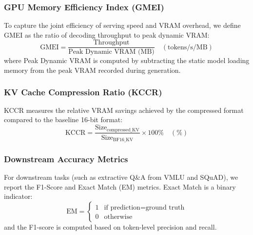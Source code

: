 \subsubsection{GPU Memory Efficiency Index (GMEI)}
To capture the joint efficiency of serving speed and VRAM overhead, we define GMEI as the ratio of decoding throughput to peak dynamic VRAM:
\begin{equation}
\text{GMEI} = \frac{\text{Throughput}}{\text{Peak Dynamic VRAM (MB)}} \quad (\text{tokens/s/MB})
\end{equation}
where Peak Dynamic VRAM is computed by subtracting the static model loading memory from the peak VRAM recorded during generation.

\subsubsection{KV Cache Compression Ratio (KCCR)}
KCCR measures the relative VRAM savings achieved by the compressed format compared to the baseline 16-bit format:
\begin{equation}
\text{KCCR} = \frac{\text{Size}_{\text{compressed\_KV}}}{\text{Size}_{\text{BF16\_KV}}} \times 100\% \quad (\%)
\end{equation}

\subsubsection{Downstream Accuracy Metrics}
For downstream tasks (such as extractive Q\&A from VMLU and SQuAD), we report the F1-Score and Exact Match (EM) metrics. Exact Match is a binary indicator:
\begin{equation}
\text{EM} = \begin{cases} 1 & \text{if } \text{prediction} = \text{ground truth} \\ 0 & \text{otherwise} \end{cases}
\end{equation}
and the F1-score is computed based on token-level precision and recall.

